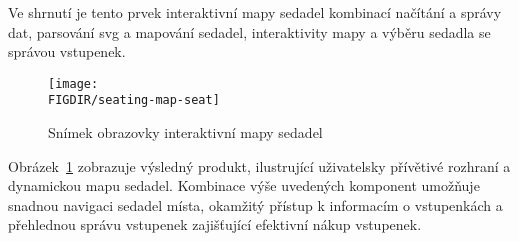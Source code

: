 Ve shrnutí je tento prvek interaktivní mapy sedadel kombinací načítání a správy dat, parsování \ac{svg} a mapování sedadel, interaktivity mapy a výběru sedadla se správou vstupenek.

\begin{figure}[h]
    \centering
    \texttt{[image: \\FIGDIR/seating-map-seat]}
    \caption{Snímek obrazovky interaktivní mapy sedadel}
    \label{fig:seating-map-seat}
\end{figure}

Obrázek~\ref{fig:seating-map-seat} zobrazuje výsledný produkt, ilustrující uživatelsky přívětivé rozhraní a dynamickou mapu sedadel.
Kombinace výše uvedených komponent umožňuje snadnou navigaci sedadel místa, okamžitý přístup k informacím o vstupenkách a přehlednou správu vstupenek zajišťující efektivní nákup vstupenek.
